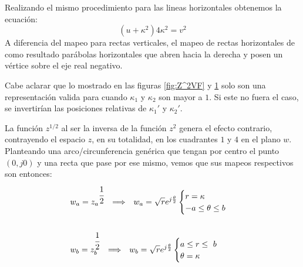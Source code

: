 Realizando el mismo procedimiento para las lineas horizontales obtenemos la ecuación:
\begin{equation}
    (u+\kappa^2)4\kappa^2=v^2
\end{equation}
A diferencia del mapeo para rectas verticales, el mapeo de rectas horizontales de como resultado parábolas horizontales que abren hacia la derecha y posen un vértice sobre el eje real negativo.
\begin{figure}[H]
    \centering
    \begin{minipage}{0.49\textwidth}
    \centering
        
    \end{minipage}
    \begin{minipage}{0.49\textwidth}
    \centering
        
    \end{minipage}
    \caption{}
    \label{fig:Z^2HF}
\end{figure}
Cabe aclarar que lo mostrado en las figuras \ref{fig:Z^2VF} y \ref{fig:Z^2HF} solo son una representación valida para cuando $\kappa_1$ y $\kappa_2$ son mayor a $1$. Si este no fuera el caso, se invertirían las posiciones relativas de $\kappa_1'$ y $\kappa_2'$.
\begin{figure}[H]
    \centering
    
    \label{fig:Z^2FC}
\end{figure}
La función $z^{1/2}$ al ser la inversa de la función $z^2$ genera el efecto contrario, contrayendo el espacio $z$, en su totalidad, en los cuadrantes $1$ y $4$ en el plano $w$.
Planteando una arco/circunferencia genérica que tengan por centro el punto $(0,j0)$ y una recta que pase por ese mismo, vemos que sus mapeos respectivos son entonces:
\begin{equation}
    \begin{aligned}
        &w_a={z_a}^{\cfrac{1}{2}}\hspace{0.25cm} \Longrightarrow \hspace{0.25cm} w_a=\sqrt{r}e^{j\frac{\theta}{2}}\begin{cases}
            r=\kappa\\
            -a\leq\theta\leq b
        \end{cases}\\
        \\
        &w_b=z_b^{\cfrac{1}{2}}\hspace{0.25cm} \Longrightarrow \hspace{0.25cm} w_b=\sqrt{r}e^{j\frac{\theta}{2}}\begin{cases}
            a\leq r\leq\ b\\
            \theta=\kappa
        \end{cases}
    \end{aligned}
\end{equation}
